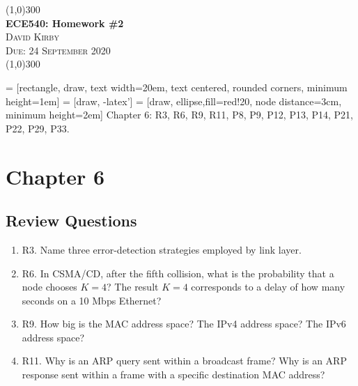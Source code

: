 \documentclass[12pt]{article}
\begin{document}
 	\begin{center}
    \line(1,0){300}\\[0.25cm]
 	\Large{\bfseries ECE540: Homework \#2}\\
 	\textsc{\large David Kirby}\\
 	\textsc{\large Due: 24 September 2020}\\
 	\line(1,0){300}\\[0.75cm]
 	\end{center}

 = [rectangle, draw,
    text width=20em, text centered, rounded corners, minimum height=1em]
 = [draw, -latex']
 = [draw, ellipse,fill=red!20, node distance=3cm,
    minimum height=2em]
Chapter 6: R3, R6, R9, R11, P8, P9, P12, P13, P14, P21, P22, P29, P33.

\section*{Chapter 6}
\subsection*{Review Questions}
\begin{enumerate}
\item R3. Name three error-detection strategies employed by link layer.

\item R6. In CSMA/CD, after the fifth collision, what is the probability that a node
chooses \(K = 4\)? The result \(K = 4\) corresponds to a delay of how many seconds on a 10 Mbps Ethernet?

\item R9. How big is the MAC address space? The IPv4 address space? The IPv6
address space?

\item R11. Why is an ARP query sent within a broadcast frame? Why is an ARP
response sent within a frame with a specific destination MAC address?
\end{enumerate}
\end{document}
